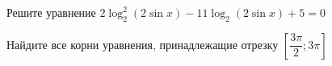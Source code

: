 \begin{ex}
	\begin{condition}
		\begin{enumcols}[label=\asbuk*)]
			\item Решите уравнение \( 2\log_2^2 (2\sin x ) - 11\log_2 (2\sin x) + 5 = 0 \)
			\item Найдите все корни уравнения, принадлежащие отрезку \( \left[\dfrac{3\pi}{2};3\pi\right] \)
		\end{enumcols}
	\end{condition}
\end{ex}